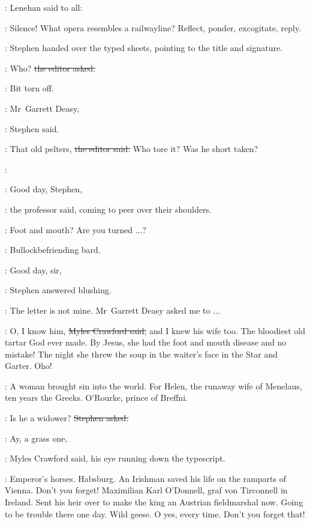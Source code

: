 
:
Lenehan said to all:

\lenehan:
Silence!
What opera resembles a railwayline?
Reflect,
ponder,
excogitate,
reply.

:
Stephen handed over the typed sheets,
pointing to the title and signature.

\crawford:
Who?
\sout{the editor asked.}

\StephenInt:
Bit torn off.

\Stephen:
Mr~Garrett Deasy,

:
Stephen said.

\crawford:
That old pelters,
\sout{the editor said.}
Who tore it?
Was he short taken?

\StephenInt:

\machugh:
Good day, Stephen,

:
the professor said,
coming to peer over their shoulders.

\machugh:
Foot and mouth?
Are you turned ...?

\StephenInt:
Bullockbefriending bard.



\Stephen:
Good day, sir,

:
Stephen answered blushing.

\Stephen:
The letter is not mine.
Mr~Garrett Deasy asked me to ...

\crawford:
O, I know him,
\sout{Myles Crawford said,}
and I knew his wife too.
The bloodiest old tartar God ever made.
By Jesus,
she had the foot and mouth disease
and no mistake!
The night she threw the soup in the waiter's face in the Star and Garter.
Oho!

\StephenInt:
A woman brought sin into the world.
For Helen,
the runaway wife of Menelaus,
ten years the Greeks.
O'Rourke,
prince of Breffni.

\Stephen:
Is he a widower?
\sout{Stephen asked.}

\crawford:
Ay, a grass one,

:
Myles Crawford said,
his eye running down the typescript.

\crawford:
Emperor's horses.
Habsburg.
An Irishman saved his life on the ramparts of Vienna.
Don't you forget!
Maximilian Karl O'Donnell,
graf von Tirconnell in Ireland.
Sent his heir over to make the king an Austrian fieldmarshal now.
Going to be trouble there one day.
Wild geese.
O yes, every time.
Don't you forget that!

